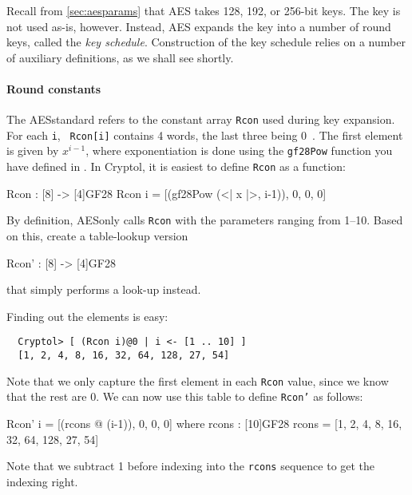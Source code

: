 Recall from \autoref{sec:aesparams} that AES takes 128, 192, or
256-bit keys. The key is not used as-is, however. Instead, AES\indAES
expands the key into a number of round keys, called the {\em key
  schedule}. Construction of the key schedule relies on a number of
auxiliary definitions, as we shall see shortly.

\paragraph*{Round constants} The AES\indAES standard refers to the constant
array {\tt Rcon} used during key expansion. For each {\tt i}, {\tt
  Rcon[i]} contains 4 words, the last three being 0~\cite[section
5.2]{aes}.  The first element is given by $x^{i-1}$, where
exponentiation is done using the {\tt gf28Pow} function you have
defined in . In Cryptol,
it is easiest to define {\tt Rcon} as a function:
\begin{code}
  Rcon : [8] -> [4]GF28
  Rcon i = [(gf28Pow (<| x |>, i-1)), 0, 0, 0]
\end{code}

\begin{Exercise}\label{ex:aeskerc:0}
  By definition, AES\indAES only calls {\tt Rcon} with the parameters
  ranging from 1--10.  Based on this, create a table-lookup version
\begin{code}
  Rcon' : [8] -> [4]GF28
\end{code}
that simply performs a look-up instead. 
\end{Exercise}
\begin{Answer}
Finding out the elements is easy:
\begin{Verbatim}
  Cryptol> [ (Rcon i)@0 | i <- [1 .. 10] ]
  [1, 2, 4, 8, 16, 32, 64, 128, 27, 54]
\end{Verbatim}
Note that we only capture the first element in each {\tt Rcon} value,
since we know that the rest are 0. We can now use this table to define
{\tt Rcon'} as follows:
\begin{code}
  Rcon' i = [(rcons @ (i-1)), 0, 0, 0]
      where rcons : [10]GF28
            rcons = [1, 2, 4, 8, 16, 32, 64, 128, 27, 54]
\end{code}
Note that we subtract 1 before indexing into the {\tt rcons} sequence
to get the indexing right.
\end{Answer}

